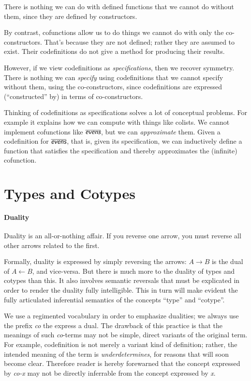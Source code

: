 \documentclass{article}
\begin{document}
There is nothing we can do with defined functions that we cannot do
without them, since they are defined by constructors.

By contrast, cofunctions allow us to do things we cannot do with only
the co-constructors. That's because they are not defined; rather they
are assumed to exist. Their codefinitions do not give a method for
producing their results.

However, if we view codefinitions as \textit{specifications}, then we
recover symmetry. There is nothing we can \textit{specify} using
codefinitions that we cannot specify without them, using the
co-constructors, since codefinitions are expressed (``constructed''
by) in terms of co-constructors.

Thinking of codefinitions as specifications solves a lot of conceptual
problems. For example it explains how we can compute with things like
colists. We cannot implement cofunctions like \(\codefn{evens}\), but
we can \textit{approximate} them. Given a codefinition for
\(\codefn{evens}\), that is, given its specification, we can
inductively define a function that satisfies the specification and
thereby approximates the (infinite) cofunction.

\section{Types and Cotypes}

\paragraph{Duality}  Duality is an all-or-nothing affair. If you reverse one arrow, you must reverse all other arrows related to the first.

Formally, duality is expressed by simply reversing the arrows:
\(A\rightarrow B\) is the dual of \(A\leftarrow B\), and vice-versa.
But there is much more to the duality of types and cotypes than this.
It also involves semantic reversals that must be explicated in order
to render the duality fully intelligible. This in turn will make
evident the fully articulated inferential semantics of the concepts
``type'' and ``cotype''.

We use a regimented vocabulary in order to emphasize dualities; we
always use the prefix \textit{co} the express a dual. The drawback of
this practice is that the meanings of such \textit{co}-terms may not
be simple, direct variants of the original term. For example,
codefinition is not merely a variant kind of definition; rather, the
intended meaning of the term is \textit{underdetermines}, for reasons
that will soon become clear. Therefore reader is hereby forewarned
that the concept expressed by \textit{co-x} may not be directly
inferrable from the concept expressed by \textit{x}.
\end{document}
